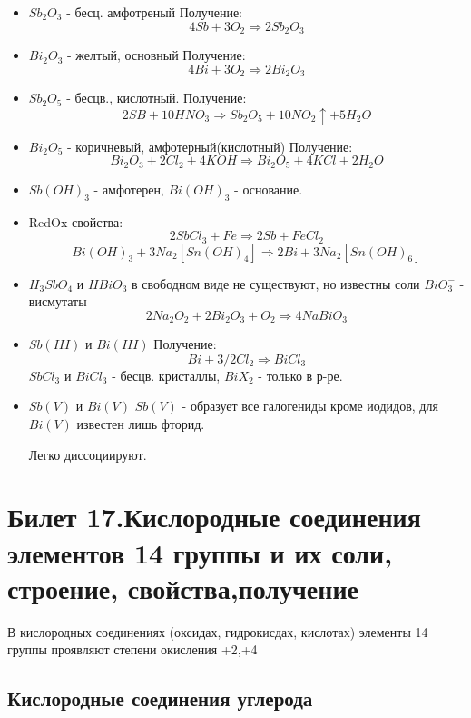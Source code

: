 \documentclass[11pt]{article}
\begin{document}
\begin{itemize}

\item $Sb_2O_3$ - бесц. амфотреный
Получение: $$4Sb + 3O_2 \Rightarrow 2Sb_2O_3$$

\item $Bi_2O_3$ - желтый, основный
Получение:$$4Bi + 3O_2 \Rightarrow 2Bi_2O_3$$

\item $Sb_2O_5$ - бесцв., кислотный.
Получение: $$2SB+10HNO_3 \Rightarrow Sb_2O_5 + 10NO_2 \uparrow +5H_2O$$

\item $Bi_2O_5$ - коричневый, амфотерный(кислотный)
Получение: $$Bi_2O_3 + 2Cl_2 + 4KOH \Rightarrow Bi_2O_5 + 4KCl + 2H_2O$$

\item $Sb(OH)_3$ - амфотерен, $Bi(OH)_3$ - основание.

\item RedOx свойства:
$$2SbCl_3 + Fe \Rightarrow 2Sb + FeCl_2$$
$$Bi(OH)_3 + 3Na_2[Sn(OH)_4] \Rightarrow 2Bi + 3 Na_2[Sn(OH)_6]$$
\item $H_3SbO_4$ и $HBiO_3$ в свободном виде не существуют, но известны соли $BiO_3^-$ - висмутаты
$$2Na_2O_2 + 2Bi_2O_3 +O_2 \Rightarrow 4NaBiO_3$$

\item $Sb(III)$ и    $Bi(III)$
Получение:
$$Bi + 3/2Cl_2 \Rightarrow BiCl_3$$
$SbCl_3$ и $BiCl_3$ - бесцв. кристаллы, $BiX_2$ - только в р-ре.

\item $Sb(V)$ и $Bi(V)$
$Sb(V)$ - образует все галогениды кроме иодидов, для $Bi(V)$ известен лишь фторид.

Легко диссоциируют. 

\end{itemize}


\section{Билет 17.Кислородные соединения элементов 14 группы и их соли, строение, свойства,получение}

В кислородных соединениях (оксидах, гидрокисдах, кислотах) элементы 14 группы
проявляют степени окисления +2,+4

\subsection{Кислородные соединения углерода}
\end{document}
